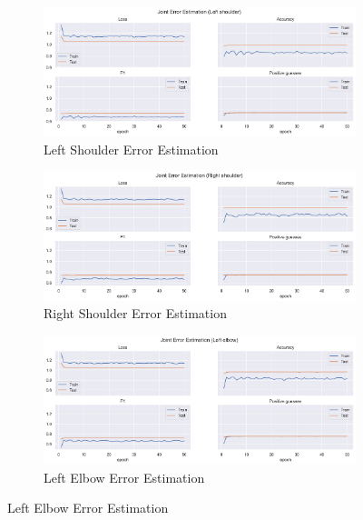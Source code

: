 \begin{figure}[!ht]
  \centering
  \begin{subfigure}[b]{0.47\linewidth}
      \centering
      \includegraphics[width=\textwidth]{figures/Results/v1/jt/Left shoulder_ErrorEstimation.png}
      \caption{Left Shoulder Error Estimation}
      \label{fig:v1_lesh_jt_ee}
  \end{subfigure}
  \hfill
  \begin{subfigure}[b]{0.47\linewidth}
      \centering
      \includegraphics[width=\textwidth]{figures/Results/v1/jt/Right shoulder_ErrorEstimation.png}
      \caption{Right Shoulder Error Estimation}
      \label{fig:v1_rish_jt_ee}
  \end{subfigure}
  \hfill
  \begin{subfigure}[b]{0.47\linewidth}
      \centering
      \includegraphics[width=\textwidth]{figures/Results/v1/jt/Left ebpow_ErrorEstimation.png}
      \caption{Left Elbow Error Estimation}

\end{subfigure}
\end{figure}

